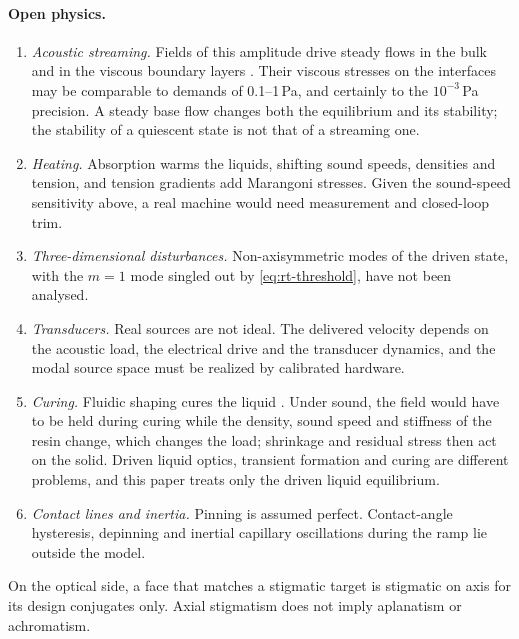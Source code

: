 \documentclass[11pt,a4paper]{article}
\numberwithin{equation}{section}
\begin{document}
\paragraph{Open physics.}
\begin{enumerate}
 \item \emph{Acoustic streaming.} Fields of this amplitude drive steady flows in
 the bulk and in the viscous boundary layers
 \cite{lighthill1978,bach2018,bruus2012perturbation}. Their viscous stresses on
 the interfaces may be comparable to demands of 0.1--1\,Pa, and certainly to the
 $10^{-3}$\,Pa precision. A steady base flow changes both the equilibrium and
 its stability; the stability of a quiescent state is not that of a streaming
 one.
 \item \emph{Heating.} Absorption warms the liquids, shifting sound speeds,
 densities and tension, and tension gradients add Marangoni stresses. Given the
 sound-speed sensitivity above, a real machine would need measurement and
 closed-loop trim.
 \item \emph{Three-dimensional disturbances.} Non-axisymmetric modes of the
 driven state, with the $m=1$ mode singled out by \cref{eq:rt-threshold}, have
 not been analysed.
 \item \emph{Transducers.} Real sources are not ideal. The delivered velocity
 depends on the acoustic load, the electrical drive and the transducer dynamics,
 and the modal source space must be realized by calibrated hardware.
 \item \emph{Curing.} Fluidic shaping cures the liquid
 \cite{frumkin2021,elgarisi2021}. Under sound, the field would have to be held
 during curing while the density, sound speed and stiffness of the resin
 change, which changes the load; shrinkage and residual stress then act on the
 solid. Driven liquid optics, transient formation and curing are different
 problems, and this paper treats only the driven liquid equilibrium.
 \item \emph{Contact lines and inertia.} Pinning is assumed perfect. Contact-angle
 hysteresis, depinning and inertial capillary oscillations during the ramp lie
 outside the model.
\end{enumerate}
On the optical side, a face that matches a stigmatic target is stigmatic on axis
for its design conjugates only. Axial stigmatism does not imply aplanatism or
achromatism.
\end{document}

